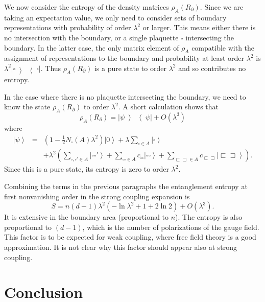 \documentclass[aps,prd,twocolumn,showpacs,groupedaddress,nofootinbib,letterpaper]{revtex4}
\newcommand{\ket}[1]{\left\vert#1\right\rangle}
\newcommand{\ketbra}[2]{\left|#1\middle\rangle \! \middle\langle#2\right|}
\newcommand{\oneloop}{\square}
\newcommand{\twoloop}{\square\!\square}
\newcommand{\wideloop}{\sqsubset\!\sqsupset}
\begin{document}
We now consider the entropy of the density matrices $\rho_A(R_{\partial})$.
Since we are taking an expectation value, we only need to consider sets of boundary representations with probability of order $\lambda^2$ or larger.
This means either there is no intersection with the boundary, or a single plaquette $\oneloop$ intersecting the boundary.
In the latter case, the only matrix element of $\rho_A$ compatible with the assignment of representations to the boundary and probability at least order $\lambda^2$ is $\lambda^2 \ketbra{\oneloop}{\oneloop}$.
Thus $\rho_A(R_{\partial})$ is a pure state to order $\lambda^2$ and so contributes no entropy.

In the case where there is no plaquette intersecting the boundary, we need to know the state $\rho_A(R_{\partial})$ to order $\lambda^2$.
A short calculation shows that 
\begin{equation}
\rho_A(R_{\partial}) = \ketbra{\psi}{\psi} + O(\lambda^3)
\end{equation}
where
\begin{eqnarray}
\ket{\psi} &=& (1 - \tfrac{1}{2} N_\oneloop(A) \lambda^2 ) \ket{0} + \lambda \sum_{\oneloop \in A} \ket{\oneloop} \\
&& + \lambda^2 \left(
\sum_{\oneloop, \oneloop' \in A} \!\!\! \ket{\oneloop \oneloop'} +
\!\!\! \sum_{\twoloop \in A} \!\!\! c_{\twoloop} \ket{\twoloop} +
\!\!\! \sum_{\wideloop \in A} \!\!\! c_{\wideloop} \ket{\wideloop} \right). \nonumber
\end{eqnarray}
Since this is a pure state, its entropy is zero to order $\lambda^2$.

Combining the terms in the previous paragraphs the entanglement entropy at first nonvanishing order in the strong coupling expansion is
\begin{equation}
S = n (d-1) \lambda^2 ( -\ln \lambda^2 + 1 + 2 \ln 2) + O(\lambda^3).
\end{equation}
It is extensive in the boundary area (proportional to $n$).
The entropy is also proportional to $(d-1)$, which is the number of polarizations of the gauge field.
This factor is to be expected for weak coupling, where free field theory is a good approximation.
It is not clear why this factor should appear also at strong coupling.

\section{Conclusion}
\end{document}
